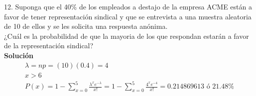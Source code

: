 12. Suponga que el 40\% de los empleados a destajo de la empresa ACME están a favor de tener representación sindical y que se entrevista a una muestra aleatoria de 10 de ellos y se les solicita una respuesta anónima.\\¿Cuál es la probabilidad de que la mayoria de los que respondan estarán a favor de la representación sindical?
\\\textbf{Solución}
\\
\begin{gather*}
    \lambda=np=(10)(0.4) = 4\\
    x>6\\
    P(x) =1-\sum _{x=0}^{5}\frac{{\lambda}^{x}{e}^{-\lambda}}{x!}=1 - \sum _{x=0}^{5}\frac{{4}^{x}{e}^{-4}}{x!} =  0.214869613 \text{ ó } 21.48\%
\end{gather*}